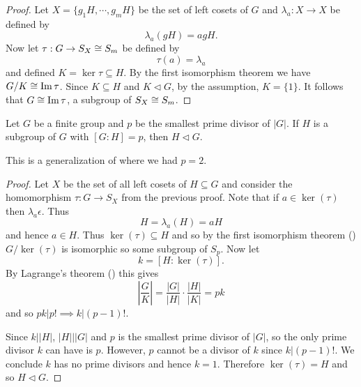 \documentclass[11pt]{article}
\begin{document}
\begin{proof}
    Let $X=\{g_1H,\cdots,g_mH\}$ be the set of left cosets of $G$ and $\lambda_a:X\to X$ be defined by
    \[\lambda_a(gH)=agH.\]
    Now let $\tau:G\to S_X\cong S_m$ be defined by
    \[\tau(a)=\lambda_a\]
    and defined $K=\ker\tau\subseteq H$. By the first isomorphism theorem we have $G/K\cong\operatorname{Im}\tau$. Since $K\subseteq H$ and $K\lhd G$, by the assumption, $K=\{1\}$. It follows that $G\cong\operatorname{Im}\tau$, a subgroup of $S_X\cong S_m$.
\end{proof}

\begin{corollary}
    Let $G$ be a finite group and $p$ be the smallest prime divisor of $|G|$. If $H$ is a subgroup of $G$ with $[G:H]=p$, then $H\lhd G$.
\end{corollary}

\begin{remark}
    This is a generalization of  where we had $p=2$.
\end{remark}

\begin{proof}
    Let $X$ be the set of all left cosets of $H\subseteq G$ and consider the homomorphism $\tau:G\to S_X$ from the previous proof. Note that if $a\in\ker(\tau)$ then $\lambda_a\epsilon$. Thus
    \[H=\lambda_a(H)=aH\]
    and hence $a\in H$. Thus $\ker(\tau)\subseteq H$ and so by the first isomorphism theorem () $G/\ker(\tau)$ is isomorphic so some subgroup of $S_p$. Now let
    \[k=[H:\ker(\tau)].\]
    By Lagrange's theorem () this gives
    \[\left|\frac GK\right|=\frac{|G|}{|H|}\cdot\frac{|H|}{|K|}=pk\]
    and so $pk|p!\implies k|(p-1)!$.
    
    Since $k\big||H|$, $|H|\big||G|$ and $p$ is the smallest prime divisor of $|G|$, so the only prime divisor $k$ can have is $p$. However, $p$ cannot be a divisor of $k$ since $k|(p-1)!$. We conclude $k$ has no prime divisors and hence $k=1$. Therefore $\ker(\tau)=H$ and so $H\lhd G$.
\end{proof}

\end{document}
